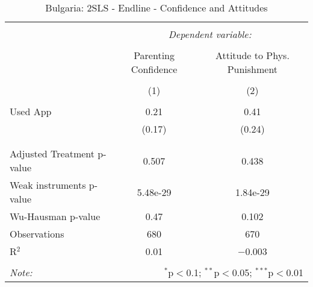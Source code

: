 
\begin{table}[!htbp] \centering 
  \caption{Bulgaria: 2SLS - Endline - Confidence and Attitudes} 
  \label{tbl:Bulgaria: 2SLS - Endline - Confidence and Attitudes} 
\begin{tabular}{@{\extracolsep{5pt}}lcc} 
\\[-1.8ex]\hline 
\hline \\[-1.8ex] 
 & \multicolumn{2}{c}{\textit{Dependent variable:}} \\ 
\cline{2-3} 
\\[-1.8ex] & Parenting Confidence & Attitude to Phys. Punishment \\ 
\\[-1.8ex] & (1) & (2)\\ 
\hline \\[-1.8ex] 
 Used App & 0.21 & 0.41 \\ 
  & (0.17) & (0.24) \\ 
  & & \\ 
\hline \\[-1.8ex] 
Adjusted Treatment p-value & 0.507 & 0.438 \\ 
Weak instruments p-value & 5.48e-29 & 1.84e-29 \\ 
Wu-Hausman p-value & 0.47 & 0.102 \\ 
Observations & 680 & 670 \\ 
R$^{2}$ & 0.01 & $-$0.003 \\ 
\hline 
\hline \\[-1.8ex] 
\textit{Note:}  & \multicolumn{2}{r}{$^{*}$p$<$0.1; $^{**}$p$<$0.05; $^{***}$p$<$0.01} \\ 
\end{tabular} 
\end{table} 
